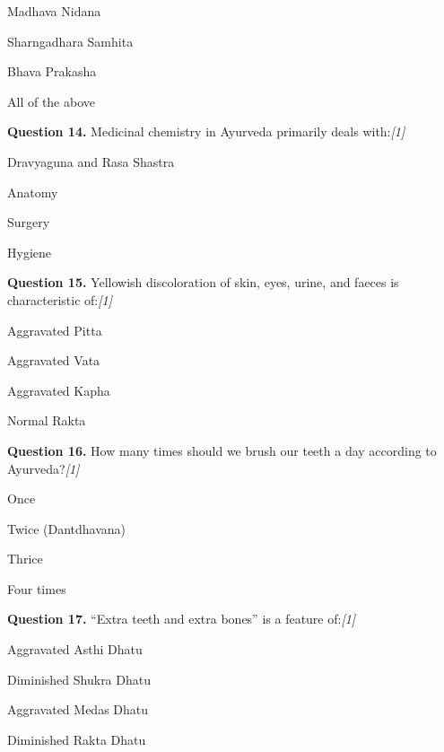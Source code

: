 \documentclass[11pt,a4paper]{article}
\newcommand{\pts}[1]{\hfill   \textit{[#1]}}
\begin{document}
\begin{parts}
  \item Madhava Nidana
  \item Sharngadhara Samhita
  \item Bhava Prakasha
  \item All of the above
\end{parts}

\medskip




\noindent   \textbf{Question 14.} Medicinal chemistry in Ayurveda primarily deals with:\pts{1}

\begin{parts}
  \item Dravyaguna and Rasa Shastra
  \item Anatomy
  \item Surgery
  \item Hygiene
\end{parts}

\medskip




\noindent   \textbf{Question 15.} Yellowish discoloration of skin, eyes, urine, and faeces is characteristic of:\pts{1}

\begin{parts}
  \item Aggravated Pitta
  \item Aggravated Vata
  \item Aggravated Kapha
  \item Normal Rakta
\end{parts}

\medskip




\noindent   \textbf{Question 16.} How many times should we brush our teeth a day according to Ayurveda?\pts{1}

\begin{parts}
  \item Once
  \item Twice (Dantdhavana)
  \item Thrice
  \item Four times
\end{parts}

\medskip




\noindent   \textbf{Question 17.} ``Extra teeth and extra bones'' is a feature of:\pts{1}

\begin{parts}
  \item Aggravated Asthi Dhatu
  \item Diminished Shukra Dhatu
  \item Aggravated Medas Dhatu
  \item Diminished Rakta Dhatu
\end{parts}
\end{document}
